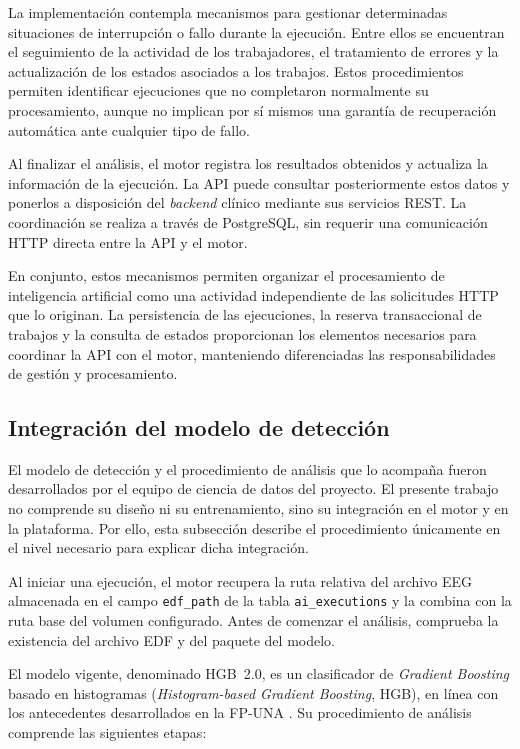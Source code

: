 La implementación contempla mecanismos
para gestionar determinadas situaciones
de interrupción o fallo durante la ejecución.
Entre ellos se encuentran el seguimiento
de la actividad de los trabajadores,
el tratamiento de errores y la actualización
de los estados asociados a los trabajos.
Estos procedimientos permiten identificar
ejecuciones que no completaron normalmente
su procesamiento, aunque no implican
por sí mismos una garantía de recuperación
automática ante cualquier tipo de fallo.

Al finalizar el análisis, el motor registra
los resultados obtenidos y actualiza
la información de la ejecución. La API
puede consultar posteriormente estos
datos y ponerlos a disposición del
\textit{backend} clínico mediante sus servicios
REST. La coordinación se realiza a través
de PostgreSQL, sin requerir una comunicación
HTTP directa entre la API y el motor.


En conjunto, estos mecanismos permiten
organizar el procesamiento de inteligencia
artificial como una actividad independiente
de las solicitudes HTTP que lo originan.
La persistencia de las ejecuciones,
la reserva transaccional de trabajos
y la consulta de estados proporcionan
los elementos necesarios para coordinar
la API con el motor, manteniendo
diferenciadas las responsabilidades
de gestión y procesamiento.


\subsection{Integración del modelo de detección}
\label{subsec:modelo-vigente-hgb}

El modelo de detección y el procedimiento de análisis que lo acompaña fueron desarrollados por el equipo de ciencia de datos del proyecto.
El presente trabajo no comprende su diseño ni su entrenamiento, sino su integración en el motor y en la plataforma.
Por ello, esta subsección describe el procedimiento únicamente en el nivel necesario para explicar dicha integración.

Al iniciar una ejecución, el motor recupera la ruta relativa del archivo EEG almacenada en el campo \texttt{edf\_path} de la tabla \texttt{ai\_executions} y la combina con la ruta base del volumen configurado.
Antes de comenzar el análisis, comprueba la existencia del archivo EDF y del paquete del modelo.

El modelo vigente, denominado HGB~2.0, es un clasificador de \textit{Gradient Boosting} basado en histogramas (\textit{Histogram-based Gradient Boosting}, HGB), en línea con los antecedentes desarrollados en la FP-UNA \citep{Lezcano2026GradientBoosting}.
Su procedimiento de análisis comprende las siguientes etapas:


